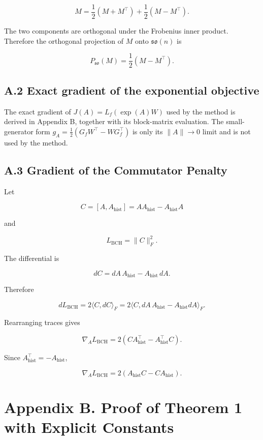 \documentclass[
]{article}
\begin{document}
\[
M=\frac{1}{2}(M+M^\top)+\frac{1}{2}(M-M^\top).
\]

The two components are orthogonal under the Frobenius inner product. Therefore the orthogonal projection of \(M\) onto \(\mathfrak{so}(n)\) is

\[
P_{\mathfrak{so}}(M)=\frac{1}{2}(M-M^\top).
\]

\subsection{A.2 Exact gradient of the exponential objective}\label{a.2-exact-gradient-of-the-exponential-objective}

The exact gradient of \(J(A)=L_f(\exp(A)W)\) used by the method is derived in Appendix B, together with its block-matrix evaluation. The small-generator form \(g_A=\tfrac{1}{2}(G_fW^\top-WG_f^\top)\) is only its \(\|A\|\to 0\) limit and is not used by the method.

\subsection{A.3 Gradient of the Commutator Penalty}\label{a.3-gradient-of-the-commutator-penalty}

Let

\[
C=[A,A_{\mathrm{hist}}]=AA_{\mathrm{hist}}-A_{\mathrm{hist}}A
\]

and

\[
L_{\mathrm{BCH}}=\|C\|_F^2.
\]

The differential is

\[
dC=dA\,A_{\mathrm{hist}}-A_{\mathrm{hist}}\,dA.
\]

Therefore

\[
dL_{\mathrm{BCH}}
=2\langle C,dC\rangle_F
=2\langle C,dA\,A_{\mathrm{hist}}-A_{\mathrm{hist}}dA\rangle_F.
\]

Rearranging traces gives

\[
\nabla_A L_{\mathrm{BCH}}
=2(CA_{\mathrm{hist}}^\top-A_{\mathrm{hist}}^\top C).
\]

Since \(A_{\mathrm{hist}}^\top=-A_{\mathrm{hist}}\),

\[
\nabla_A L_{\mathrm{BCH}}
=2(A_{\mathrm{hist}}C-CA_{\mathrm{hist}}).
\]

\section{Appendix B. Proof of Theorem 1 with Explicit Constants}\label{appendix-b.-proof-of-theorem-1-with-explicit-constants}
\end{document}
